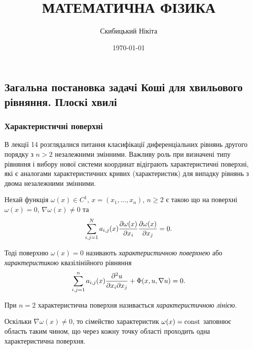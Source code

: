 

\title{{\Huge МАТЕМАТИЧНА ФІЗИКА}}
\author{Скибицький Нікіта}
\date{\today}





\tableofcontents

\setcounter{section}{3}
\setcounter{subsection}{8}

\subsection{Загальна постановка задачі Коші для хвильового рівняння. Плоскі хвилі}

\subsubsection{Характеристичні поверхні}

В лекції 14 розглядалися питання класифікації диференціальних рівнянь другого порядку з $n > 2$ незалежними змінними. Важливу роль при визначені типу рівняння і вибору нової системи координат відіграють характеристичні поверхні, які є аналогами характеристичних кривих (характеристик) для випадку рівнянь з двома незалежними змінними. \medskip

Нехай функція $\omega(x) \in C^1$, $x = (x_1, \ldots, x_n)$, $n \ge 2$ є такою що на поверхні $\omega(x) = 0$, $\nabla \omega(x) \ne 0$ та
\begin{equation}
    \displaystyle\sum\limits_{i, j = 1}^N a_{i,j}(x) \frac{\partial \omega(x)}{\partial x_i} \frac{\partial \omega(x)}{\partial x_j} = 0.
\end{equation}

\begin{definition}
    Тоді поверхню $\omega(x) = 0$ називають \textit{характеристичною поверхнею} або \textit{характеристикою} квазілінійного рівняння
    \begin{equation}
        \displaystyle\sum\limits_{i, j = 1}^n a_{i, j}(x) \frac{\partial^2 u}{\partial x_i \partial x_j} + \Phi(x, u, \nabla u) = 0.
    \end{equation}
\end{definition}

\begin{definition}
    При $n = 2$ характеристична поверхня називається \textit{характеристичною лінією}.
\end{definition}

Оскільки $\nabla \omega(x) \ne 0$, то сімейство характеристик $\omega(x) = \operatorname{const}$ заповнює область таким чином, що через кожну точку області проходить одна характеристична поверхня. \medskip

